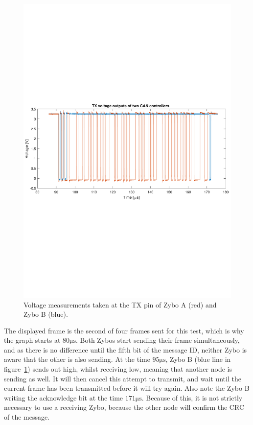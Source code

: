 \begin{figure}[h]
	\centering
	\includegraphics[width = \linewidth]{graphics/CAN_test3_2TX}
	\caption{Voltage measurements taken at the TX pin of Zybo A (red) and Zybo B (blue).}
	\label{fig:CAN_test3_2TX}
\end{figure}

The displayed frame is the second of four frames sent for this test, which is why the graph starts at $80 \si{\micro\second}$.
Both Zybos start sending their frame simultaneously, and as there is no difference until the fifth bit of the message ID, neither Zybo is aware that the other is also sending.
At the time $95\si{\micro\second}$, Zybo B (blue line in figure~\ref{fig:CAN_test3_2TX}) sends out high, whilst receiving low, meaning that another node is sending as well. 
It will then cancel this attempt to transmit, and wait until the current frame has been transmitted before it will try again.
Also note the Zybo B writing the acknowledge bit at the time $171 \si{\micro\second}$.
Because of this, it is not strictly necessary to use a receiving Zybo, because the other node will confirm the CRC of the message.\\

